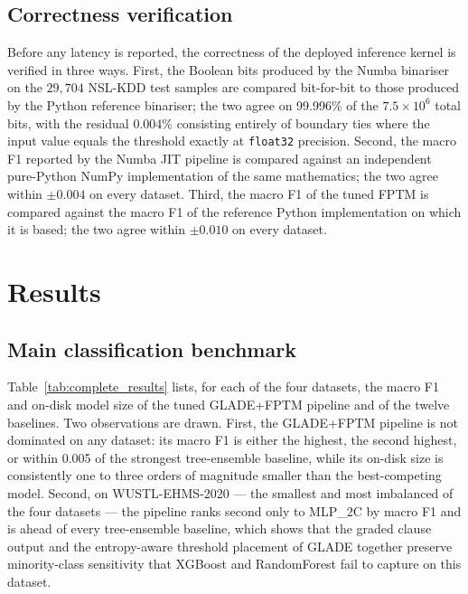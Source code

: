 \documentclass[journal,10pt]{IEEEtran}
\begin{document}
\subsection{Correctness verification}
\label{sec:correctness}
Before any latency is reported, the correctness of the deployed
inference kernel is verified in three ways. First, the Boolean bits
produced by the Numba binariser on the $29{,}704$ NSL-KDD test
samples are compared bit-for-bit to those produced by the Python
reference binariser; the two agree on 99.996\% of the $7.5
\times 10^{6}$ total bits, with the residual 0.004\% consisting
entirely of boundary ties where the input value equals the threshold
exactly at \texttt{float32} precision. Second, the macro F1 reported
by the Numba JIT pipeline is compared against an independent
pure-Python NumPy implementation of the same mathematics; the two
agree within $\pm 0.004$ on every dataset. Third, the macro F1 of
the tuned FPTM is compared against the macro F1 of the reference
Python implementation on which it is based; the two agree within
$\pm 0.010$ on every dataset.

\section{Results}
\label{sec:results}

\subsection{Main classification benchmark}
\label{sec:res-main}

Table~\ref{tab:complete_results} lists, for each of the four
datasets, the macro F1 and on-disk model size of the tuned GLADE+FPTM
pipeline and of the twelve baselines. Two observations are drawn.
First, the GLADE+FPTM pipeline is not dominated on any dataset: its
macro F1 is either the highest, the second highest, or within 0.005
of the strongest tree-ensemble baseline, while its on-disk size is
consistently one to three orders of magnitude smaller than the
best-competing model. Second, on WUSTL-EHMS-2020 --- the smallest
and most imbalanced of the four datasets --- the pipeline ranks
second only to MLP\_2C by macro F1 and is ahead of every
tree-ensemble baseline, which shows that the graded clause output and
the entropy-aware threshold placement of GLADE together preserve
minority-class sensitivity that XGBoost and RandomForest fail to
capture on this dataset.
\end{document}
